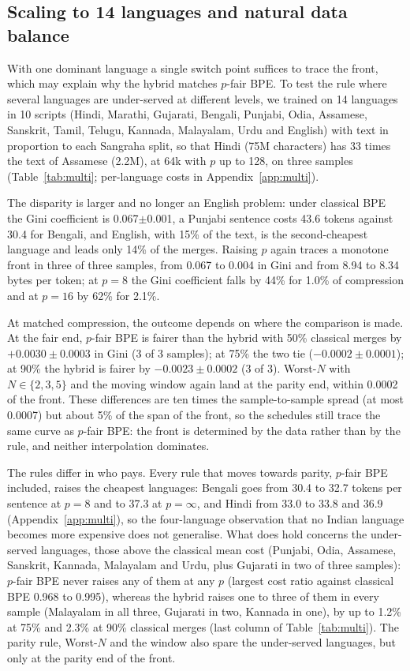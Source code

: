 \subsection{Scaling to 14 languages and natural data balance}
\label{sec:multi}

With one dominant language a single switch point suffices to trace the front, which may
explain why the hybrid matches $p$-fair BPE. To test the rule where several languages are
under-served at different levels, we trained on 14 languages in 10 scripts (Hindi, Marathi,
Gujarati, Bengali, Punjabi, Odia, Assamese, Sanskrit, Tamil, Telugu, Kannada, Malayalam,
Urdu and English) with text in proportion to each Sangraha split, so that Hindi (75M
characters) has 33 times the text of Assamese (2.2M), at 64k with $p$ up to 128, on three
samples (Table~\ref{tab:multi}; per-language costs in Appendix~\ref{app:multi}).

The disparity is larger and no longer an English problem: under classical BPE the Gini
coefficient is 0.067$\pm$0.001, a Punjabi sentence costs 43.6 tokens against 30.4 for
Bengali, and English, with 15\% of the text, is the second-cheapest language and leads only
14\% of the merges. Raising $p$ again traces a monotone front in three of three samples,
from 0.067 to 0.004 in Gini and from 8.94 to 8.34 bytes per token; at $p=8$ the Gini
coefficient falls by 44\% for 1.0\% of compression and at $p=16$ by 62\% for 2.1\%.

At matched compression, the outcome depends on where the comparison is made. At the fair
end, $p$-fair BPE is fairer than the hybrid with 50\% classical merges by
$+0.0030\pm0.0003$ in Gini (3 of 3 samples); at 75\% the two tie ($-0.0002\pm0.0001$); at 90\% the
hybrid is fairer by $-0.0023\pm0.0002$ (3 of 3). Worst-$N$ with $N\in\{2,3,5\}$ and the moving
window again land at the parity end, within 0.0002 of the front. These differences are ten times the sample-to-sample spread (at most 0.0007) but about 5\%
of the span of the front, so the schedules still trace the same curve as $p$-fair BPE: the
front is determined by the data rather than by the rule, and neither interpolation dominates.

The rules differ in who pays. Every rule that moves towards parity, $p$-fair BPE included,
raises the cheapest languages: Bengali goes from 30.4 to 32.7 tokens per sentence at $p=8$
and to 37.3 at $p=\infty$, and Hindi from 33.0 to 33.8 and 36.9 (Appendix~\ref{app:multi}),
so the four-language observation that no Indian language becomes more expensive does not
generalise. What does hold concerns the under-served languages, those above the classical
mean cost (Punjabi, Odia, Assamese, Sanskrit, Kannada, Malayalam and Urdu, plus Gujarati in
two of three samples): $p$-fair BPE never raises any of them at any $p$ (largest cost ratio
against classical BPE 0.968 to 0.995), whereas the hybrid raises one to three of them in
every sample (Malayalam in all three, Gujarati in two, Kannada in one), by up to 1.2\% at
75\% and 2.3\% at 90\% classical merges (last column of Table~\ref{tab:multi}). The parity
rule, Worst-$N$ and the window also spare the under-served languages, but only at the parity
end of the front.

